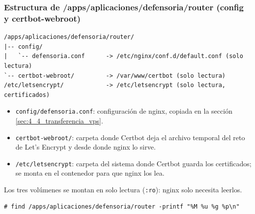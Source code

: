 \subsubsection{Estructura de /apps/aplicaciones/defensoria/router (config y certbot-webroot)}
\begin{lstlisting}
/apps/aplicaciones/defensoria/router/
|-- config/
|   `-- defensoria.conf      -> /etc/nginx/conf.d/default.conf (solo lectura)
`-- certbot-webroot/         -> /var/www/certbot (solo lectura)
/etc/letsencrypt/            -> /etc/letsencrypt (solo lectura, certificados)
\end{lstlisting}
\begin{itemize}
  \item \texttt{config/defensoria.conf}: configuración de nginx, copiada en la sección \ref{sec:4_4_transferencia_vps}.
  \item \texttt{certbot-webroot/}: carpeta donde Certbot deja el archivo temporal del reto de Let's Encrypt y desde donde nginx lo sirve.
  \item \texttt{/etc/letsencrypt}: carpeta del sistema donde Certbot guarda los certificados; se monta en el contenedor para que nginx los lea.
\end{itemize}
Los tres volúmenes se montan en solo lectura (\texttt{:ro}): nginx solo necesita leerlos.
\begin{lstlisting}
# find /apps/aplicaciones/defensoria/router -printf "%M %u %g %p\n"
\end{lstlisting}
